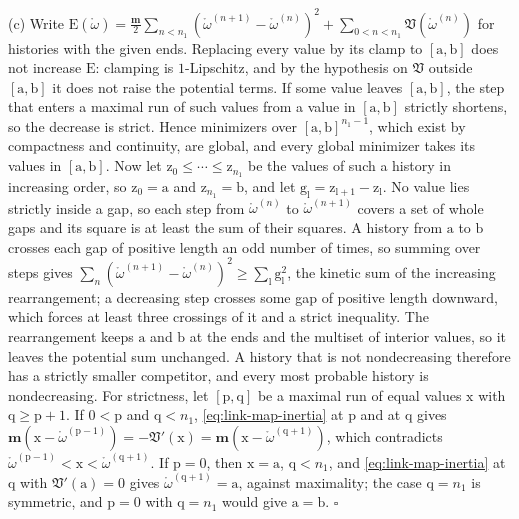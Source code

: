 (c) Write $\mathrm E(\mathring\omega)=\tfrac{\mathbf m}2\sum_{n<n_1}(\mathring\omega^{(n+1)}-\mathring\omega^{(n)})^2+\sum_{0<n<n_1}\mathfrak V(\mathring\omega^{(n)})$
for histories with the given ends. Replacing every value by its clamp to $[\mathrm a,\mathrm b]$ does
not increase $\mathrm E$: clamping is $1$-Lipschitz, and by the hypothesis on $\mathfrak V$ outside
$[\mathrm a,\mathrm b]$ it does not raise the potential terms. If some value leaves $[\mathrm a,\mathrm b]$, the
step that enters a maximal run of such values from a value in $[\mathrm a,\mathrm b]$ strictly
shortens, so the decrease is strict. Hence minimizers over $[\mathrm a,\mathrm b]^{n_1-1}$, which
exist by compactness and continuity, are global, and every global minimizer takes its values in
$[\mathrm a,\mathrm b]$. Now let $\mathrm z_0\leq\cdots\leq\mathrm z_{n_1}$ be the values of such a
history in increasing order, so $\mathrm z_0=\mathrm a$ and $\mathrm z_{n_1}=\mathrm b$, and let
$\mathrm g_{\mathrm l}=\mathrm z_{\mathrm l+1}-\mathrm z_{\mathrm l}$. No value lies strictly inside a gap, so each step from
$\mathring\omega^{(n)}$ to $\mathring\omega^{(n+1)}$ covers a set of whole gaps and its square is at
least the sum of their squares. A history from $\mathrm a$ to $\mathrm b$ crosses each gap of
positive length an odd number of times, so summing over steps gives
$\sum_n(\mathring\omega^{(n+1)}-\mathring\omega^{(n)})^2\geq\sum_{\mathrm l}\mathrm g_{\mathrm l}^2$, the kinetic sum of
the increasing rearrangement; a decreasing step crosses some gap of positive length downward, which
forces at least three crossings of it and a strict inequality. The rearrangement keeps $\mathrm a$
and $\mathrm b$ at the ends and the multiset of interior values, so it leaves the potential sum
unchanged. A history that is not nondecreasing therefore has a strictly smaller competitor, and
every most probable history is nondecreasing. For strictness, let $[\mathrm p,\mathrm q]$ be a
maximal run of equal values $\mathrm x$ with $\mathrm q\geq\mathrm p+1$. If $0<\mathrm p$ and
$\mathrm q<n_1$, \eqref{eq:link-map-inertia} at $\mathrm p$ and at $\mathrm q$ gives
$\mathbf m(\mathrm x-\mathring\omega^{(\mathrm p-1)})=-\mathfrak V'(\mathrm x)=\mathbf m(\mathrm x-\mathring\omega^{(\mathrm q+1)})$,
which contradicts $\mathring\omega^{(\mathrm p-1)}<\mathrm x<\mathring\omega^{(\mathrm q+1)}$. If
$\mathrm p=0$, then $\mathrm x=\mathrm a$, $\mathrm q<n_1$, and \eqref{eq:link-map-inertia} at
$\mathrm q$ with $\mathfrak V'(\mathrm a)=0$ gives $\mathring\omega^{(\mathrm q+1)}=\mathrm a$, against
maximality; the case $\mathrm q=n_1$ is symmetric, and $\mathrm p=0$ with $\mathrm q=n_1$ would give
$\mathrm a=\mathrm b$. \hfill$\square$

